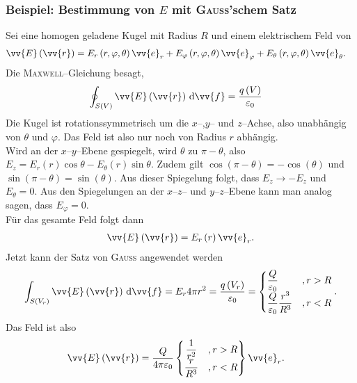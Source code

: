 \documentclass[a4paper,12pt]{article}
\newcommand{\td}{\,\text{d}}
\numberwithin{equation}{section}
\begin{document}
\subsubsection{Beispiel: Bestimmung von $E$ mit \textsc{Gauss}'schem Satz}
Sei eine homogen geladene Kugel mit Radius $R$ und einem elektrischem Feld von
\begin{align} 
        \vv{E}\left(\vv{r}\right)&=E_r\left(r,\varphi ,\theta \right)\vv{e}_r+E_\varphi \left(r,\varphi ,\theta \right)\vv{e}_\varphi +E_\theta \left(r,\varphi ,\theta \right)\vv{e}_\theta 
.\end{align} 
Die \textsc{Maxwell}--Gleichung besagt,
\begin{align} 
        \oint_{S\left(V\right)}^{}\vv{E}\left(\vv{r}\right)\td \vv{f}&=\dfrac{q\left(V\right)}{\varepsilon _0}
\end{align} 
Die Kugel ist rotationssymmetrisch um die $x$--,$y$-- und $z$--Achse, also unabhängig von $\theta $ und $\varphi $. Das Feld ist also nur noch von Radius $r$ abhängig.\\\indent
Wird an der $x$--$y$--Ebene gespiegelt, wird $\theta $ zu $\pi -\theta $, also $E_z=E_r\left(r\right)\cos \theta -E_\theta \left(r\right)\sin \theta $. Zudem gilt $\cos \left(\pi -\theta \right)=-\cos \left(\theta \right)$ und $\sin \left(\pi -\theta \right)=\sin \left(\theta \right)$. Aus dieser Spiegelung folgt, dass $E_z\rightarrow -E_z$ und $E_\theta =0$. Aus den Spiegelungen an der $x$--$z$-- und $y$--$z$--Ebene kann man analog sagen, dass $E_\varphi =0$.\\\indent
Für das gesamte Feld folgt dann
\begin{align} 
        \vv{E}\left(\vv{r}\right)=E_r\left(r\right)\vv{e}_r
.\end{align} 
Jetzt kann der Satz von \textsc{Gauss} angewendet werden
\begin{align} 
        \int_{S\left(V_r\right)}^{}\vv{E}\left(\vv{r}\right)\td \vv{f}=E_r4\pi r^2=\dfrac{q\left(V_r\right)}{\varepsilon _0}=\begin{cases}
                \dfrac{Q}{\varepsilon _0}&,r>R\\
                \dfrac{Q}{\varepsilon _0}\dfrac{r^3}{R^3}&,r<R
        \end{cases}
.\end{align} 
Das Feld ist also
\begin{align} 
        \vv{E}\left(\vv{r}\right)&=\dfrac{Q}{4\pi \varepsilon _0}\left\{\begin{matrix}
                        \dfrac{1}{r^2}&,r>R\\
                        \dfrac{r}{R^3}&,r<R
        \end{matrix}\right\}\vv{e}_r
.\end{align} 
\end{document}
